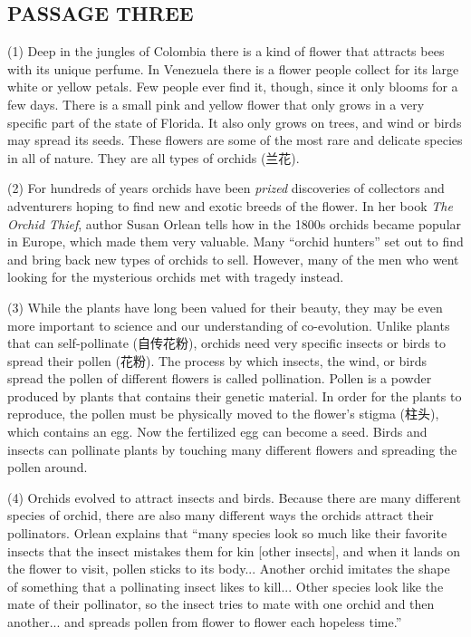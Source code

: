 \documentclass[UTF8,11pt]{ctexart}
\begin{document}
\subsection*{\textbf{PASSAGE THREE}}


(1) Deep in the jungles of Colombia there is a kind of flower that attracts bees with its unique perfume. In Venezuela there is a flower people collect for its large white or yellow petals. Few people ever find it, though, since it only blooms for a few days. There is a small pink and yellow flower that only grows in a very specific part of the state of Florida. It also only grows on trees, and wind or birds may spread its seeds. These flowers are some of the most rare and delicate species in all of nature. They are all types of orchids (兰花).


(2) For hundreds of years orchids have been \textit{prized} discoveries of collectors and adventurers hoping to find new and exotic breeds of the flower. In her book \textit{The Orchid Thief}, author Susan Orlean tells how in the 1800s orchids became popular in Europe, which made them very valuable. Many “orchid hunters” set out to find and bring back new types of orchids to sell. However, many of the men who went looking for the mysterious orchids met with tragedy instead.


(3) While the plants have long been valued for their beauty, they may be even more important to science and our understanding of co-evolution. Unlike plants that can self-pollinate (自传花粉), orchids need very specific insects or birds to spread their pollen (花粉). The process by which insects, the wind, or birds spread the pollen of different flowers is called pollination. Pollen is a powder produced by plants that contains their genetic material. In order for the plants to reproduce, the pollen must be physically moved to the flower’s stigma (柱头), which contains an egg. Now the fertilized egg can become a seed. Birds and insects can pollinate plants by touching many different flowers and spreading the pollen around.


(4) Orchids evolved to attract insects and birds. Because there are many different species of orchid, there are also many different ways the orchids attract their pollinators. Orlean explains that “many species look so much like their favorite insects that the insect mistakes them for kin [other insects], and when it lands on the flower to visit, pollen sticks to its body... Another orchid imitates the shape of something that a pollinating insect likes to kill... Other species look like the mate of their pollinator, so the insect tries to mate with one orchid and then another... and spreads pollen from flower to flower each hopeless time.”
\end{document}
